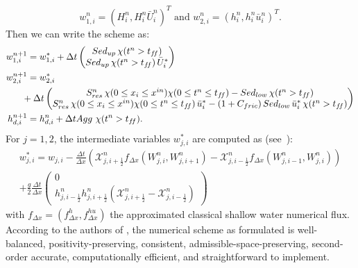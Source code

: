 $$w^n_{1,i} = (H^n_i,H^n_i\bar{U}^n_i)^T \mbox{ and } w^n_{2,i} = (h^n_i,h^n_i\bar{u}^n_i)^T.$$
Then we can write the scheme as:
\begin{align*}
    w_{1,i}^{n+1} &= w_{1,i}^* + \Delta t \begin{pmatrix}
        Sed_{up} \, \chi(t^n > t_{f\!f})\\
        Sed_{up} \, \chi(t^n > t_{f\!f}) \,  \bar{U}_i^*
    \end{pmatrix}\\
    w_{2,i}^{n+1} &= w_{2,i}^* \\
     & \hspace{-0.2cm}+ \Delta t
    \begin{pmatrix}
        S^n_{res}\, \chi( 0 \leq x_i \leq x^{in})\chi( 0 \leq t^n \leq t_{f\!f}) - Sed_{low} \, \chi(t^n > t_{f\!f})\\
        S^n_{res} \, \chi( 0 \leq x_i \leq x^{in})\chi( 0 \leq t^n \leq t_{f\!f})\, \bar{u}_i^* - (1 + C_{fric})\, Sed_{low} \,  \bar{u}_i^* \, \chi(t^n > t_{f\!f})
    \end{pmatrix}
    \\
    h_{d,i}^{n+1} & = h_{d,i}^n + \Delta t Agg \ \chi(t^n > t_{f\!f}).
\end{align*}
For $j = 1,2$, the intermediate variables $w_{j,i}^*$ are computed as (see~\cite{BerFouMor}):
\begin{multline*}
    w_{j,i}^* = w_{j,i} - \frac{\Delta t}{\Delta x} (\mathcal{X}^n_{j,i+\frac{1}{2}}f_{\Delta x}(W_{j,i}^n,W_{j,i+1}^n) - \mathcal{X}^n_{j,i-\frac{1}{2}}f_{\Delta x}(W_{j,i-1}^n,W_{j,i}^n)) \\+ \frac{g}{2}\frac{\Delta t}{\Delta x} \begin{pmatrix}
        0 \\
        h_{j,i-\frac{1}{2}}^n h_{j,i+\frac{1}{2}}^n ( \mathcal{X}^n_{j,i+\frac{1}{2}} - \mathcal{X}^n_{j,i-\frac{1}{2}})
    \end{pmatrix}
\end{multline*}
with $f_{\Delta x} = (f^h_{\Delta x},f^{hu}_{\Delta x})$ the approximated classical shallow water numerical flux.
According to the authors of \cite{BerFouMor}, the numerical scheme as formulated is well-balanced, positivity-preserving, consistent, admissible-space-preserving, second-order accurate, computationally efficient, and straightforward to implement.

